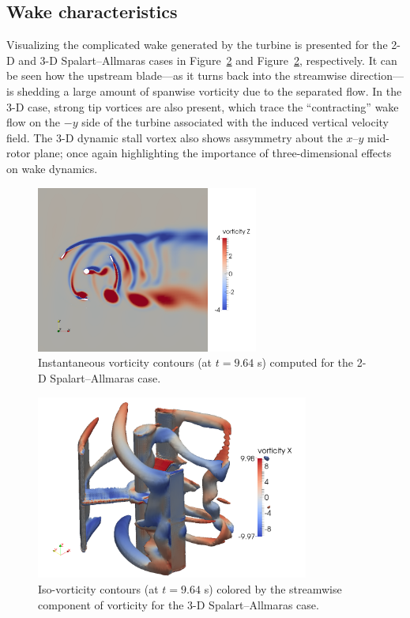 \documentclass[aip,graphicx]{revtex4-1}
\begin{document}
\subsection{Wake characteristics}

Visualizing the complicated wake generated by the turbine is presented for the
2-D and 3-D Spalart--Allmaras cases in Figure~\ref{fig:vorticity-3D} and
Figure~\ref{fig:vorticity-3D}, respectively. It can be seen how the upstream
blade---as it turns back into the streamwise direction---is shedding a large
amount of spanwise vorticity due to the separated flow. In the 3-D case, strong
tip vortices are also present, which trace the ``contracting'' wake flow on the
$-y$ side of the turbine associated with the induced vertical velocity field.
The 3-D dynamic stall vortex also shows assymmetry about the $x$--$y$ mid-rotor
plane; once again highlighting the importance of three-dimensional effects on
wake dynamics.

\begin{figure}
    \includegraphics[width=0.65\textwidth]{figures/2D_vorticity_SA_964}
    
    \caption{Instantaneous vorticity contours (at $t=9.64$ s) computed for the
        2-D Spalart--Allmaras case.}
    
    \label{fig:vorticity-2D}
\end{figure}

\begin{figure}
    \centering
    
    \includegraphics[width=0.8\textwidth]{figures/3D_vorticity_SA_964_10-threshold}
    
    \caption{Iso-vorticity contours (at $t=9.64$ s) colored by the streamwise
        component of vorticity for the 3-D Spalart--Allmaras case.}
    
    \label{fig:vorticity-3D}
\end{figure}
\end{document}
